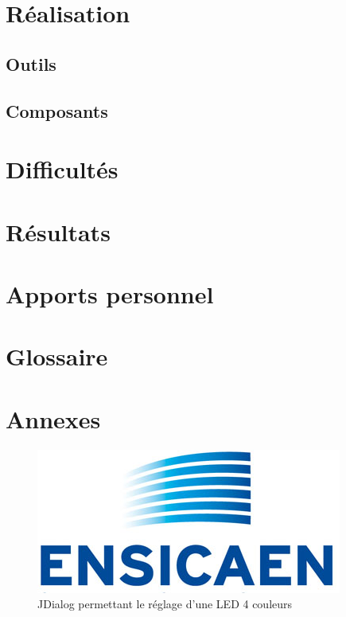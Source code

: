 \documentclass[a4paper,11pt]{myreport}
\begin{document}
\chapter{Réalisation}
\section{Outils}
\section{Composants}
\chapter{Difficultés}

\chapter{Résultats}

\chapter{Apports personnel}

\chapter{Glossaire}

\chapter{Annexes}

\begin{figure}[h]
	\includegraphics[scale=0.70]{./images/LogoEnsicaenSansTexte.jpg}
	\caption{JDialog permettant le réglage d'une LED 4 couleurs}
\end{figure}
\end{document}
